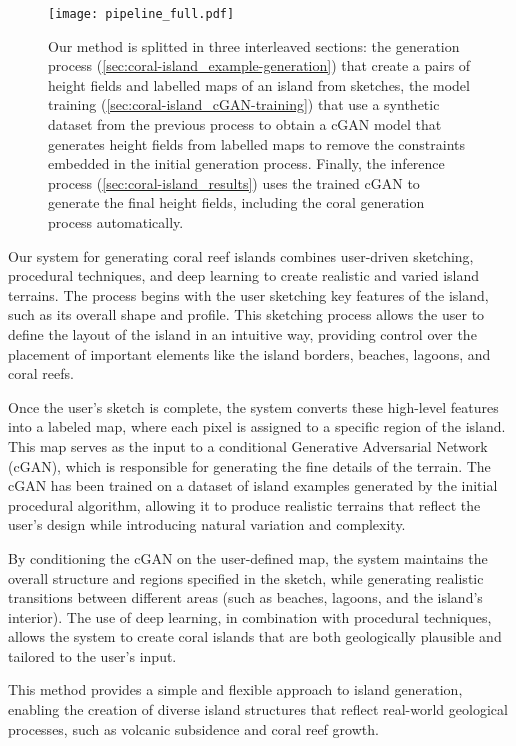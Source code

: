 \begin{figure}[H]
    \texttt{[image: pipeline\_full.pdf]}
    \caption{Our method is splitted in three interleaved sections: the generation process (\cref{sec:coral-island_example-generation}) that create a pairs of height fields and labelled maps of an island from sketches, the model training (\cref{sec:coral-island_cGAN-training}) that use a synthetic dataset from the previous process to obtain a cGAN model that generates height fields from labelled maps to remove the constraints embedded in the initial generation process. Finally, the inference process (\cref{sec:coral-island_results}) uses the trained cGAN to generate the final height fields, including the coral generation process automatically. }
\end{figure}
Our system for generating coral reef islands combines user-driven sketching, procedural techniques, and deep learning to create realistic and varied island terrains. The process begins with the user sketching key features of the island, such as its overall shape and profile. This sketching process allows the user to define the layout of the island in an intuitive way, providing control over the placement of important elements like the island borders, beaches, lagoons, and coral reefs.

Once the user's sketch is complete, the system converts these high-level features into a labeled map, where each pixel is assigned to a specific region of the island. This map serves as the input to a conditional Generative Adversarial Network (cGAN), which is responsible for generating the fine details of the terrain. The cGAN has been trained on a dataset of island examples generated by the initial procedural algorithm, allowing it to produce realistic terrains that reflect the user's design while introducing natural variation and complexity.

By conditioning the cGAN on the user-defined map, the system maintains the overall structure and regions specified in the sketch, while generating realistic transitions between different areas (such as beaches, lagoons, and the island's interior). The use of deep learning, in combination with procedural techniques, allows the system to create coral islands that are both geologically plausible and tailored to the user's input.

This method provides a simple and flexible approach to island generation, enabling the creation of diverse island structures that reflect real-world geological processes, such as volcanic subsidence and coral reef growth.




